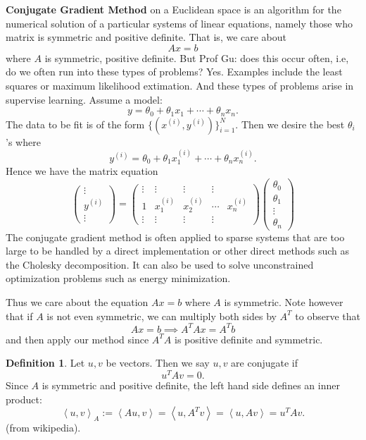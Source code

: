 \documentclass[12pt,letterpaper,boxed]{maths_v5}
\theoremstyle{definition}
\newtheorem{definition}{Definition}[section]
\begin{document}
    \textbf{Conjugate Gradient Method} on a Euclidean space is an algorithm for the numerical solution 
    of a  particular systems of linear equations, namely those who matrix is symmetric and positive definite. 
    That is, we care about 
    \[
        Ax = b
    \]
    where $A$ is symmetric, positive definite. But Prof Gu: does this occur often, i.e,
    do we often run into these types of problems? Yes. Examples include the least 
    squares or maximum likelihood extimation. And these types of problems arise in 
    supervise learning. Assume a model: 
    \[
        y = \theta_0 + \theta_1x_1 + \cdots + \theta_nx_n.  
    \]
    The data to be fit is of the form $\{(x^{(i)}, y^(i))\}_{i = 1}^{N}$. Then 
    we desire the best $\theta_i$'s where 
    \[
        y^{(i)} = \theta_0 + \theta_1x_1^{(i)} + \cdots + \theta_nx_n^{(i)}. 
    \]
    Hence we have the matrix equation 
    \[
        \begin{pmatrix}
            \vdots \\
            y^{(i)}\\
            \vdots
        \end{pmatrix}
        = 
        \begin{pmatrix}
            \vdots & \vdots & \vdots & \vdots\\
            1 & x_1^{(i)} & x_2^{(i)}& \cdots & x_n^{(i)}\\
            \vdots & \vdots & \vdots & \vdots
        \end{pmatrix}
        \begin{pmatrix}
            \theta_0\\
            \theta_1\\
            \vdots\\
            \theta_n
        \end{pmatrix}
    \]
    The conjugate gradient method is often applied to sparse systems that are too large to be handled by a direct 
    implementation or other direct methods such as the Cholesky  decomposition. It can 
    also be used to solve unconstrained optimization problems such as energy minimization.  

    Thus we care about the equation $Ax= b$ where $A$ is symmetric. Note however that if $A$ 
    is not even symmetric, we can multiply both sides by $A^T$ to observe that 
    \[
        Ax= b \implies A^TAx = A^Tb
    \]
    and then apply our method since $A^TA$ is positive definite and symmetric. 

    \begin{definition}
        Let $u, v$ be vectors. Then we say $u,v$ are conjugate if 
        \[
            u^TAv= 0.
        \]
        Since $A$ is symmetric and positive definite, the left hand side defines an inner product:
        \[
            \left<u,v  \right>_A := \left<Au,  v \right> = \left<u, A^Tv \right> = \left<u, Av \right> = u^TAv.
        \]
        (from wikipedia).
    \end{definition}
\end{document}
